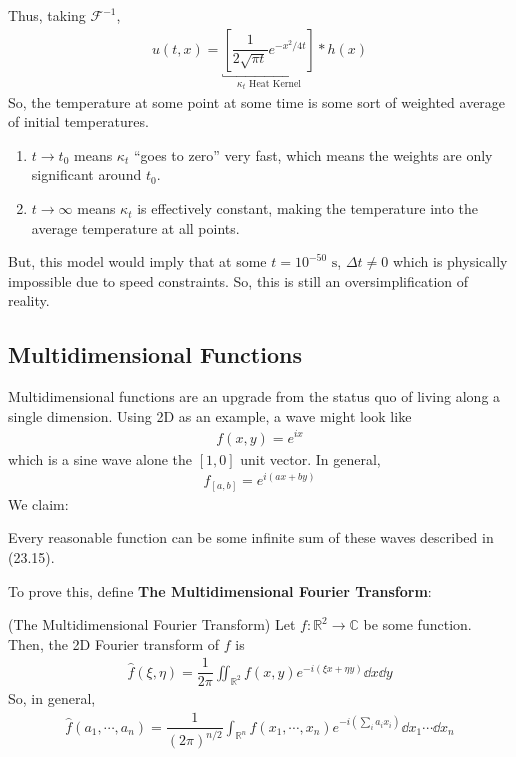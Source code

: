 Thus, taking $\mathcal{F}^{-1}$,
\begin{align}
    u(t, x) = \underbracket{\left[ \dfrac{1}{2\sqrt{\pi t}} e^{-x^2/4t} \right]}_{\kappa_t\text{ Heat Kernel}} * h(x)
\end{align}
So, the temperature at some point at some time is some sort of weighted average of initial temperatures.
\begin{enumerate}
    \item $t \to t_0$ means $\kappa_t$ ``goes to zero'' very fast, which means the weights are only significant around $t_0$.
    \item $t \to \infty$ means $\kappa_t$ is effectively constant, making the temperature into the average temperature at all points.
\end{enumerate}
But, this model would imply that at some $t = 10^{-50} \text{ s}$, $\Delta t \ne 0$ which is physically impossible due to speed constraints. So, this is still an oversimplification of reality.

\subsection{Multidimensional Functions}
Multidimensional functions are an upgrade from the status quo of living along a single dimension. Using 2D as an example, a wave might look like
\begin{align}
    f(x, y) = e^{ix}
\end{align}
which is a sine wave alone the $[1,0]$ unit vector. In general,
\begin{align}
    f_{[a,b]} = e^{i(ax+by)}
\end{align}
We claim:
\begin{theorem}
    Every reasonable function can be some infinite sum of these waves described in (23.15).
\end{theorem}
To prove this, define \textbf{The Multidimensional Fourier Transform}:
\begin{definition}
    (The Multidimensional Fourier Transform) Let $f: \mathbb{R}^2 \to \mathbb{C}$ be some function. Then, the 2D Fourier transform of $f$ is
    \begin{align}
        \widehat{f}(\xi, \eta) = \dfrac{1}{2\pi} \iint_{\mathbb{R}^2} f(x, y) e^{-i(\xi x + \eta y)} \dd{x}\dd{y}
    \end{align}
    So, in general,
    \begin{align}
        \widehat{f}(a_1, \cdots, a_n) = \dfrac{1}{(2\pi)^{n/2}} \int_{\mathbb{R}^n} f(x_1, \cdots, x_n) e^{-i(\sum_i a_i x_i)} \dd{x_1}\cdots\dd{x_n}
    \end{align}
\end{definition}

